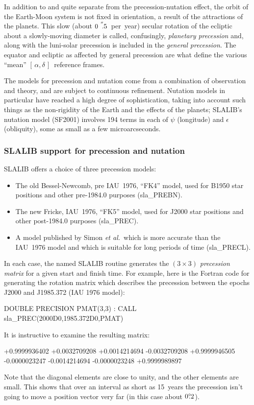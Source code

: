 \documentclass[11pt,twoside,nolof]{starlink}
\providecommand{\radec}     {$[\,\alpha,\delta\,]$}
\providecommand{\degree}[2] {$#1^{\circ}
                        \hspace{-0.37em}.\hspace{0.02em}#2$}
\providecommand{\arcsec}[2] {\arcseci{#1}$\hspace{-0.4em}.#2$}
\providecommand{\arcseci}[1] {$#1\hspace{-0.05em}$\raisebox{-0.5ex}
                         {$^{'\hspace{-0.1em}'}$}}
\begin{document}
In addition to and quite separate
from the precession-nutation effect, the orbit of the Earth-Moon system
is not fixed in orientation, a result of the attractions of the
planets.  This slow (about \arcsec{0}{5}~per~year)
secular rotation of the ecliptic about a slowly-moving diameter is called,
confusingly, \textit{planetary
precession}\/ and, along with the luni-solar precession is
included in the \textit{general precession}.  The equator and
ecliptic as affected by general precession
are what define the various ``mean'' \radec\ reference frames.

The models for precession and nutation come from a combination
of observation and theory, and are subject to continuous
refinement.  Nutation models in particular have reached a high
degree of sophistication, taking into account such things as
the non-rigidity of the Earth and the effects of
the planets; SLALIB's nutation
model (SF2001) involves 194 terms in each of $\psi$ (longitude)
and $\epsilon$ (obliquity), some as small as a few microarcseconds.

\subsubsection{SLALIB support for precession and nutation}
SLALIB offers a choice of three precession models:
\begin{itemize}
\item The old Bessel-Newcomb, pre IAU~1976, ``FK4'' model, used for B1950
      star positions and other pre-1984.0 purposes
(sla\_PREBN).
\item The new Fricke, IAU~1976, ``FK5'' model, used for J2000 star
      positions and other post-1984.0 purposes
(sla\_PREC).
\item A model published by Simon \textit{et al.}\ which is more accurate than
      the IAU~1976 model and which is suitable for long
      periods of time
(sla\_PRECL).
\end{itemize}
In each case, the named SLALIB routine generates the $(3\times3)$
\textit{precession
matrix}\/ for a given start and finish time.  For example,
here is the Fortran code for generating the rotation
matrix which describes the precession between the epochs
J2000 and J1985.372 (IAU 1976 model):
\goodbreak
\begin{terminalv}
            DOUBLE PRECISION PMAT(3,3)
             :
            CALL sla_PREC(2000D0,1985.372D0,PMAT)
\end{terminalv}
\goodbreak
It is instructive to examine the resulting matrix:
\goodbreak
\begin{terminalv}
            +0.9999936402  +0.0032709208  +0.0014214694
            -0.0032709208  +0.9999946505  -0.0000023247
            -0.0014214694  -0.0000023248  +0.9999989897
\end{terminalv}
\goodbreak
Note that the diagonal elements are close to unity, and the
other elements are small.  This shows that over an interval as
short as 15~years the precession isn't going to move a
position vector very far (in this case about \degree{0}{2}).
\end{document}
